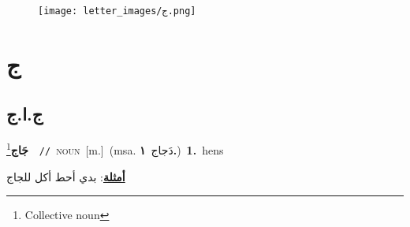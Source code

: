 \documentclass[10pt,a4paper,twoside]{article} %
\begin{document}
\begin{figure*}[t!]\centering\texttt{[image: letter\_images/ج.png]}\end{figure*}
\color{white}

 \section*{\foreignlanguage{arabic}{ج}} 
 \begin{multicols}{2} 

%
\color{black}
\vspace{-3mm}
\subsection*{\color{blue}\foreignlanguage{arabic}{ج.ا.ج}\color{blue}{ (ntws)}} 

{\setlength\topsep{0pt}\textbf{\foreignlanguage{arabic}{جَاج}}\footnote{Collective noun}\ \ {\color{gray}\texttt{//}\color{black}}\ \textsc{noun}\ [m.]\ \color{gray}(msa. \foreignlanguage{arabic}{دَجاج}~\foreignlanguage{arabic}{\textbf{١.}})\color{black}\ \textbf{1.}~hens\  \begin{flushright}\color{gray}\foreignlanguage{arabic}{\textbf{\underline{\foreignlanguage{arabic}{أمثلة}}}: بدي أحط أكل للجاج}\end{flushright}\color{black}} \vspace{2mm}


\end{multicols}
\end{document}
